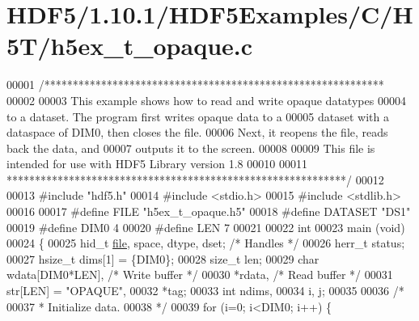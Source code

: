 \hypertarget{_h_d_f5_21_810_81_2_h_d_f5_examples_2_c_2_h5_t_2h5ex__t__opaque_8c_source}{}\section{H\+D\+F5/1.10.1/\+H\+D\+F5\+Examples/\+C/\+H5\+T/h5ex\+\_\+t\+\_\+opaque.c}
\label{_h_d_f5_21_810_81_2_h_d_f5_examples_2_c_2_h5_t_2h5ex__t__opaque_8c_source}

\begin{DoxyCode}
00001 \textcolor{comment}{/************************************************************}
00002 \textcolor{comment}{}
00003 \textcolor{comment}{  This example shows how to read and write opaque datatypes}
00004 \textcolor{comment}{  to a dataset.  The program first writes opaque data to a}
00005 \textcolor{comment}{  dataset with a dataspace of DIM0, then closes the file.}
00006 \textcolor{comment}{  Next, it reopens the file, reads back the data, and}
00007 \textcolor{comment}{  outputs it to the screen.}
00008 \textcolor{comment}{}
00009 \textcolor{comment}{  This file is intended for use with HDF5 Library version 1.8}
00010 \textcolor{comment}{}
00011 \textcolor{comment}{ ************************************************************/}
00012 
00013 \textcolor{preprocessor}{#include "hdf5.h"}
00014 \textcolor{preprocessor}{#include <stdio.h>}
00015 \textcolor{preprocessor}{#include <stdlib.h>}
00016 
00017 \textcolor{preprocessor}{#define FILE            "h5ex\_t\_opaque.h5"}
00018 \textcolor{preprocessor}{#define DATASET         "DS1"}
00019 \textcolor{preprocessor}{#define DIM0            4}
00020 \textcolor{preprocessor}{#define LEN             7}
00021 
00022 \textcolor{keywordtype}{int}
00023 main (\textcolor{keywordtype}{void})
00024 \{
00025     hid\_t       \hyperlink{structfile}{file}, space, dtype, dset;   \textcolor{comment}{/* Handles */}
00026     herr\_t      status;
00027     hsize\_t     dims[1] = \{DIM0\};
00028     \textcolor{keywordtype}{size\_t}      len;
00029     \textcolor{keywordtype}{char}        wdata[DIM0*LEN],            \textcolor{comment}{/* Write buffer */}
00030                 *rdata,                     \textcolor{comment}{/* Read buffer */}
00031                 str[LEN] = \textcolor{stringliteral}{"OPAQUE"},
00032                 *tag;
00033     \textcolor{keywordtype}{int}         ndims,
00034                 i, j;
00035 
00036     \textcolor{comment}{/*}
00037 \textcolor{comment}{     * Initialize data.}
00038 \textcolor{comment}{     */}
00039     \textcolor{keywordflow}{for} (i=0; i<DIM0; i++) \{

\end{DoxyCode}
